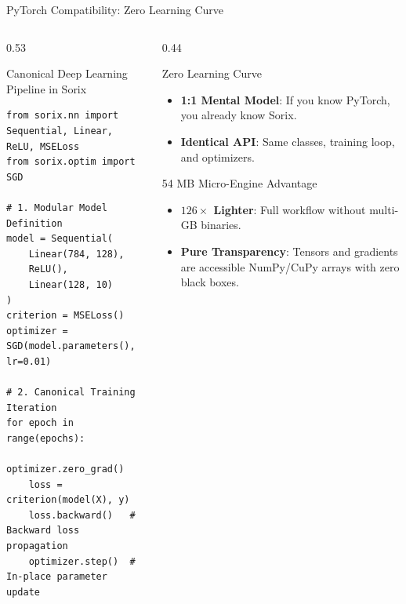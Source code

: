 \documentclass[11pt,aspectratio=169]{beamer}
\begin{document}
\begin{frame}[fragile]{PyTorch Compatibility: Zero Learning Curve}
  \begin{columns}[T,onlytextwidth]
    \begin{column}{0.53\textwidth}
      \begin{block}{Canonical Deep Learning Pipeline in Sorix}
        \begin{lstlisting}
from sorix.nn import Sequential, Linear, ReLU, MSELoss
from sorix.optim import SGD

# 1. Modular Model Definition
model = Sequential(
    Linear(784, 128),
    ReLU(),
    Linear(128, 10)
)
criterion = MSELoss()
optimizer = SGD(model.parameters(), lr=0.01)

# 2. Canonical Training Iteration
for epoch in range(epochs):
    optimizer.zero_grad()
    loss = criterion(model(X), y)
    loss.backward()   # Backward loss propagation
    optimizer.step()  # In-place parameter update
        \end{lstlisting}
      \end{block}
    \end{column}

    \begin{column}{0.44\textwidth}
      \begin{exampleblock}{Zero Learning Curve}
        \begin{itemize}
          \setlength{\itemsep}{0.1em}
          \item \textbf{1:1 Mental Model}: If you know PyTorch, you already know Sorix.
          \item \textbf{Identical API}: Same classes, training loop, and optimizers.
        \end{itemize}
      \end{exampleblock}

      \begin{alertblock}{54 MB Micro-Engine Advantage}
        \begin{itemize}
          \setlength{\itemsep}{0.1em}
          \item \textbf{$126\times$ Lighter}: Full workflow without multi-GB binaries.
          \item \textbf{Pure Transparency}: Tensors and gradients are accessible NumPy/CuPy arrays with zero black boxes.
        \end{itemize}
      \end{alertblock}
    \end{column}
  \end{columns}
\end{frame}
\end{document}
